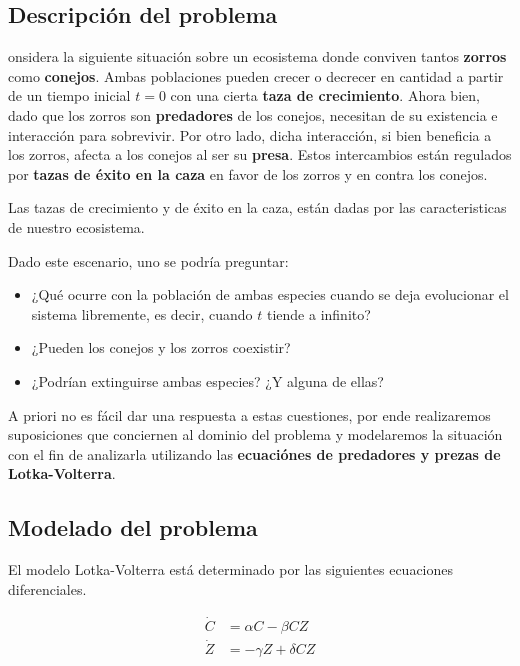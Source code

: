 \documentclass[10pt,journal,compsoc]{IEEEtran}
\begin{document}
\subsection{Descripción del problema}
onsidera la siguiente situación sobre un ecosistema donde
 conviven tantos \textbf{zorros} como \textbf{conejos}. Ambas poblaciones pueden
 crecer o decrecer en cantidad a partir de un tiempo inicial $t = 0$ con una
 cierta \textbf{taza de crecimiento}. Ahora bien, dado que los zorros son
 \textbf{predadores} de los conejos, necesitan de su existencia e interacción
 para sobrevivir. Por otro lado, dicha interacción, si bien beneficia a los
 zorros, afecta a los conejos al ser su \textbf{presa}. Estos intercambios están
 regulados por \textbf{tazas de éxito en la caza} en favor de los zorros y en
 contra los conejos.

 Las tazas de crecimiento y de éxito en la caza, están dadas por las
 caracteristicas de nuestro ecosistema.

 Dado este escenario, uno se podría preguntar:
 \begin{itemize}
   \item ¿Qué ocurre con la población de ambas especies cuando se deja
   evolucionar el sistema libremente, es decir, cuando $t$ tiende a infinito?
   \item ¿Pueden los conejos y los zorros coexistir?
   \item ¿Podrían extinguirse ambas especies? ¿Y alguna de ellas?
 \end{itemize}

 A priori no es fácil dar una respuesta a estas cuestiones, por ende
 realizaremos suposiciones que conciernen al dominio del problema y modelaremos
 la situación con el fin de analizarla utilizando las \textbf{ecuaciónes de
 predadores y prezas de Lotka-Volterra}.

 \subsection{Modelado del problema}
 El modelo Lotka-Volterra está determinado por las siguientes ecuaciones
 diferenciales.
 
 \begin{equation*}
   \begin{aligned}
    \dot C &= \alpha C - \beta CZ \\
    \dot Z &= -\gamma Z + \delta CZ
   \end{aligned}
 \end{equation*}
\end{document}
